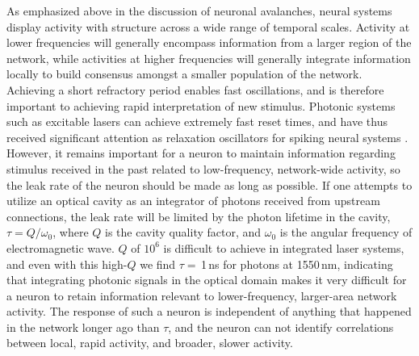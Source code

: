 \documentclass[twocolumn]{article}
\begin{document}
As emphasized above in the discussion of neuronal avalanches, neural systems display activity with structure across a wide range of temporal scales. Activity at lower frequencies will generally encompass information from a larger region of the network, while activities at higher frequencies will generally integrate information locally to build consensus amongst a smaller population of the network. Achieving a short refractory period enables fast oscillations, and is therefore important to achieving rapid interpretation of new stimulus. Photonic systems such as excitable lasers can achieve extremely fast reset times, and have thus received significant attention as relaxation oscillators for spiking neural systems \cite{dukr1999,prsh2017}. However, it remains important for a neuron to maintain information regarding stimulus received in the past related to low-frequency, network-wide activity, so the leak rate of the neuron should be made as long as possible. If one attempts to utilize an optical cavity as an integrator of photons received from upstream connections, the leak rate will be limited by the photon lifetime in the cavity, $\tau = Q/\omega_0$, where $Q$ is the cavity quality factor, and $\omega_0$ is the angular frequency of electromagnetic wave. $Q$ of $10^{6}$ is difficult to achieve in integrated laser systems, and even with this high-$Q$ we find $\tau =$\,1\,ns for photons at 1550\,nm, indicating that integrating photonic signals in the optical domain makes it very difficult for a neuron to retain information relevant to lower-frequency, larger-area network activity. The response of such a neuron is independent of anything that happened in the network longer ago than $\tau$, and the neuron can not identify correlations between local, rapid activity, and broader, slower activity.
\end{document}
